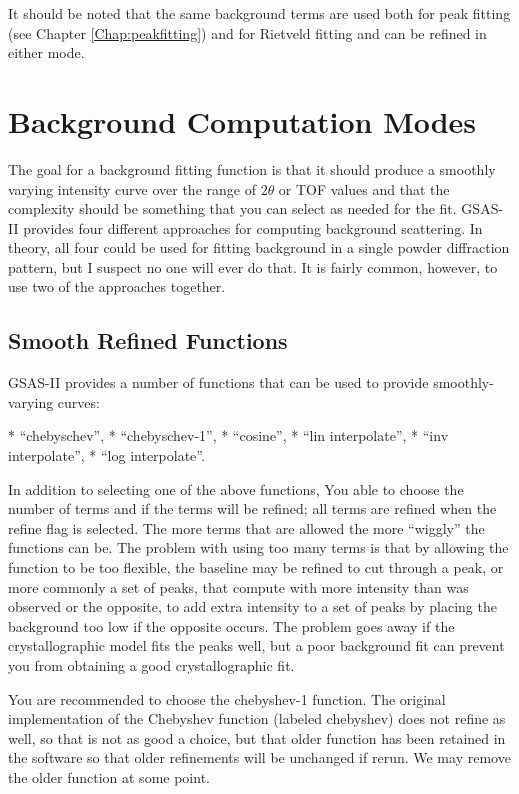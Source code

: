 It should be noted that the same background terms are used both for peak fitting (see Chapter \ref{Chap:peakfitting}) and for Rietveld fitting and can be refined in either mode. 

\section{Background Computation Modes}

The goal for a background fitting function is that it should produce a smoothly varying intensity curve over the range of $2\theta$ or TOF values and that the complexity should be something that you can select as needed for the fit. GSAS-II provides four different approaches for computing background scattering. In theory, all four could be used for fitting background in a single powder diffraction pattern, but I suspect no one will ever do that. It is fairly common, however, to use two of the approaches together. 

\subsection{Smooth Refined Functions}

GSAS-II provides a number of functions that can be used to provide smoothly-varying curves:

      * ``chebyschev'', 
      * ``chebyschev-1'', 
      * ``cosine'', 
      * ``lin interpolate'', 
      * ``inv interpolate'',
      * ``log interpolate''. 
      
In addition to selecting one of the above functions, You able to choose the number of terms and if the terms will be refined; all terms are refined when the refine flag is selected.  The more terms that are allowed the more ``wiggly'' the functions can be. The problem with using too many terms is that by allowing the function to be too flexible, the baseline may be refined to cut through a peak, or more commonly a set of peaks, that compute with more intensity than was observed or the opposite, to add extra intensity to a set of peaks by placing the background too low if the opposite occurs. The problem goes away if the crystallographic model fits the peaks well, but a poor background fit can prevent you from obtaining a good crystallographic fit. 

You are recommended to choose the chebyshev-1 function. The original implementation of the Chebyshev  function (labeled chebyshev) does not refine as well, so that is not as good a choice, but that older function has been retained in the software so that older refinements will be unchanged if rerun. We may remove the older function at some point. 

